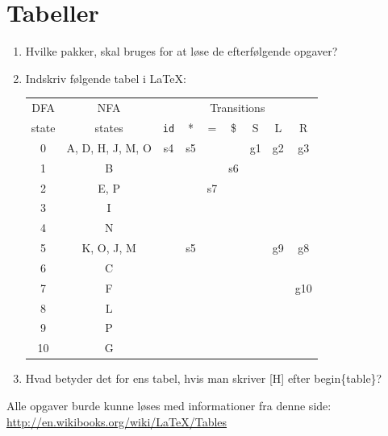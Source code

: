 \documentclass[12pt]{article}
\begin{document}
\section{Tabeller}
	\begin{enumerate}
  		\item Hvilke pakker, skal bruges for at løse de efterfølgende opgaver?
  		\item Indskriv følgende tabel i \LaTeX{}:
\begin{table}[H]
\center
\begin{tabular}{c| c| c c c c| c c c}
DFA & NFA & \multicolumn{7}{c}{Transitions} \\
state & states & \texttt{id} & * & = & \$ & S & L & R \\
\hline
0 & A, D, H, J, M, O 	& s4 	& s5 	&     	&      	& g1 	& g2 	& g3\\
1 & B                       	&      &      	&     	& s6 	&      	&      	& \\
2 & E, P                   	&      &     	& s7 	&      	&     	&      	& \\
3 & I                         	&     	&    	&      	&      	&     	&      	& \\
4 & N                       	& 	&     	&      	&      	&     	&      	& \\
5 & K, O, J, M		& 	& s5	& 	& 	& 	& g9	& g8\\
6 & C			& 	& 	&	&	&	&	& \\
7 & F			&	&	&	&	&	&	& g10\\
8 & L				& 	& 	&	&	&	&	& \\
9 & P			& 	& 	&	&	&	&	& \\
10 & G 			& 	& 	&	&	&	&	& \\
\end{tabular}
\end{table}

 		\item Hvad betyder det for ens tabel, hvis man skriver [H] efter begin\{table\}?
	\end{enumerate}

Alle opgaver burde kunne løses med informationer fra denne side:\\
\url{http://en.wikibooks.org/wiki/LaTeX/Tables}

\newpage
\end{document}
